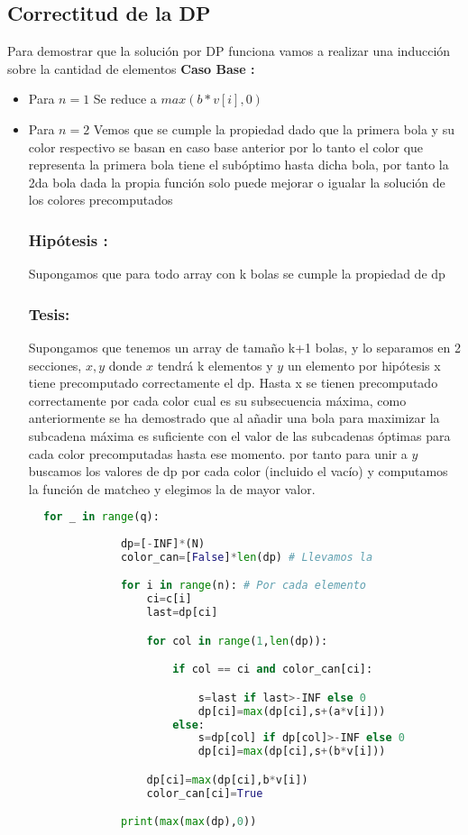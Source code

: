 \documentclass{article}
\begin{document}
\subsection{Correctitud de la DP}
Para demostrar que la solución por DP funciona vamos a realizar una inducción sobre la cantidad de elementos
\textbf{Caso Base : }
\begin{itemize}
    \item Para $n=1$ Se reduce a $max(b*v[i],0)$
    \item Para $n=2$ Vemos que se cumple la propiedad dado que la primera bola y su color respectivo se basan en caso base anterior 
     por lo tanto el color que representa la primera bola tiene el subóptimo hasta dicha bola, por tanto la 2da bola dada la propia función solo puede mejorar 
     o igualar la solución de los colores precomputados

\subsubsection{Hipótesis :}
Supongamos que para todo array con k bolas se cumple la propiedad de dp
\subsubsection{Tesis:}
Supongamos que tenemos un array de tamaño k+1 bolas, y lo separamos en 2 secciones, $x,y$ donde $x$ tendrá k elementos y $y$ un elemento
por hipótesis x tiene precomputado correctamente el dp.
Hasta x se tienen precomputado correctamente por cada color cual es su subsecuencia máxima, como anteriormente se ha demostrado que al añadir una
bola para maximizar la subcadena máxima es suficiente con el valor de las subcadenas óptimas para cada color precomputadas hasta ese momento.
por tanto para unir a $y$ buscamos los valores de dp por cada color (incluido el vacío) y computamos la función de matcheo y elegimos la de mayor valor.

     
\end{itemize}


\begin{figure}[H]
    \centering
    \begin{lstlisting}[language=Python]
        for _ in range(q):
            
            dp=[-INF]*(N)
            color_can=[False]*len(dp) # Llevamos la 

            for i in range(n): # Por cada elemento
                ci=c[i]
                last=dp[ci]

                for col in range(1,len(dp)):

                    if col == ci and color_can[ci]:

                        s=last if last>-INF else 0
                        dp[ci]=max(dp[ci],s+(a*v[i])) 
                    else:
                        s=dp[col] if dp[col]>-INF else 0
                        dp[ci]=max(dp[ci],s+(b*v[i]))

                dp[ci]=max(dp[ci],b*v[i])
                color_can[ci]=True

            print(max(max(dp),0))
    \end{lstlisting}
\end{figure}
 
\end{document}
